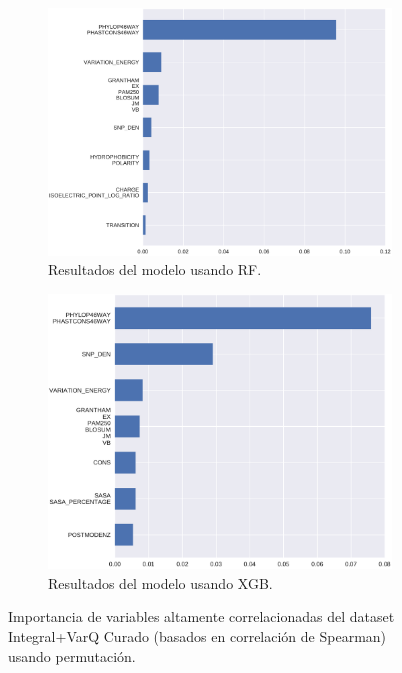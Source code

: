 \begin{figure}[H]
\begin{subfigure}[c]{0.50\linewidth}
\includegraphics[width=\linewidth]{documents/latex/figures/3/integral_varq/integral_varq_importance_cluster.pdf}
\caption{Resultados del modelo usando RF.}
\label{fig:importance_cluster_integral_varq}
\end{subfigure}
\begin{subfigure}[c]{0.45\linewidth}
\includegraphics[width=\linewidth]{documents/latex/figures/3/integral_varq/integral_varq_importance_cluster_xgb.pdf}
\caption{Resultados del modelo usando XGB.}
\label{fig:importance_cluster_integral_varq_xgb}
\end{subfigure}%
\caption{Importancia de variables altamente correlacionadas del dataset Integral+VarQ Curado (basados en correlación de Spearman) usando permutación.}
\end{figure}



